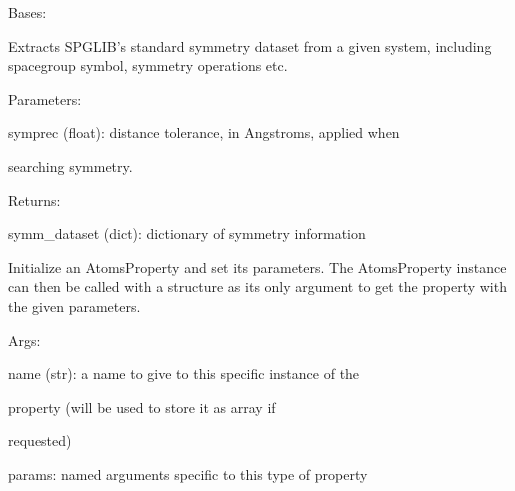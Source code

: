 \documentclass[letterpaper,10pt,english]{sphinxmanual}
\begin{document}
\begin{fulllineitems}
\label{doctree/soprano.properties.symmetry.symmetry:soprano.properties.symmetry.symmetry.SymmetryDataset}
Bases: {\hyperref[doctree/soprano.properties.atomsproperty:soprano.properties.atomsproperty.AtomsProperty]{}}

Extracts SPGLIB's standard symmetry dataset from a given system, including
spacegroup symbol, symmetry operations etc.

\begin{DUlineblock}{0em}
\item[] Parameters:
\item[]
\begin{DUlineblock}{\DUlineblockindent}
\item[] symprec (float): distance tolerance, in Angstroms, applied when
\item[]
\begin{DUlineblock}{\DUlineblockindent}
\item[] searching symmetry.
\end{DUlineblock}
\end{DUlineblock}
\end{DUlineblock}

\begin{DUlineblock}{0em}
\item[] Returns:
\item[]
\begin{DUlineblock}{\DUlineblockindent}
\item[] symm\_dataset (dict): dictionary of symmetry information
\end{DUlineblock}
\end{DUlineblock}

Initialize an AtomsProperty and set its parameters.
The AtomsProperty instance can then be called with a structure as its
only argument to get the property with the given parameters.

\begin{DUlineblock}{0em}
\item[] Args:
\item[]
\begin{DUlineblock}{\DUlineblockindent}
\item[] name (str): a name to give to this specific instance of the
\item[]
\begin{DUlineblock}{\DUlineblockindent}
\item[] property (will be used to store it as array if
\item[] requested)
\end{DUlineblock}
\item[] params: named arguments specific to this type of property
\end{DUlineblock}
\end{DUlineblock}


\end{fulllineitems}
\end{document}
